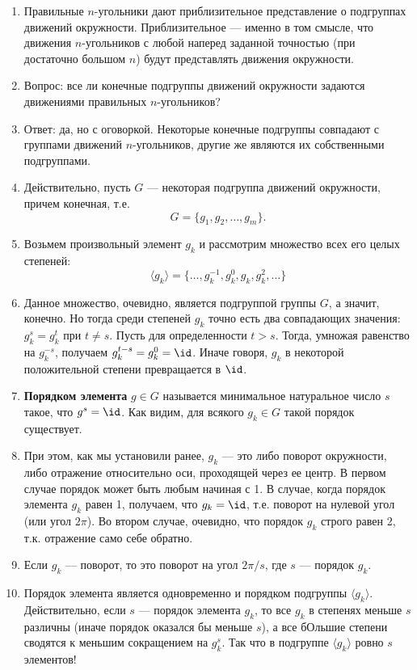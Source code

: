 \begin{enumerate}
\item Правильные $n$-угольники дают приблизительное представление о подгруппах движений окружности. Приблизительное --- именно в том смысле, что движения $n$-угольников с любой наперед заданной точностью (при достаточно большом $n$) будут представлять движения окружности.
\item Вопрос: все ли конечные подгруппы движений окружности задаются движениями правильных $n$-угольников?
\item Ответ: да, но с оговоркой. Некоторые конечные подгруппы совпадают с группами движений $n$-угольников, другие же являются их собственными подгруппами.
\item Действительно, пусть $G$ --- некоторая подгруппа движений окружности, причем конечная, т.е.
$$
G=\{g_1,g_2,\dots,g_m\}.
$$
\item Возьмем произвольный элемент $g_k$ и рассмотрим множество всех его целых степеней:
$$
\langle g_k\rangle=\{\dots,g_k^{-1},g_k^0,g_k,g_k^2,\dots\}
$$
\item Данное множество, очевидно, является подгруппой группы $G$, а значит, конечно. Но тогда среди степеней $g_k$ точно есть два совпадающих значения: $g_k^s=g_k^t$ при $t\ne s$. Пусть для определенности $t>s$. Тогда, умножая равенство на $g_k^{-s}$, получаем $g_k^{t-s}=g_k^0=\id$. Иначе говоря, $g_k$ в некоторой положительной степени превращается в $\id$.
\item \textbf{Порядком элемента} $g\in G$ называется минимальное натуральное число $s$ такое, что $g^s=\id$. Как видим, для всякого $g_k\in G$ такой порядок существует.
\item При этом, как мы установили ранее, $g_k$ --- это либо поворот окружности, либо отражение относительно оси, проходящей через ее центр. В первом случае порядок может быть любым начиная с 1. В случае, когда порядок элемента $g_k$ равен 1, получаем, что $g_k=\id$, т.е. поворот на нулевой угол (или угол $2\pi$). Во втором случае, очевидно, что порядок $g_k$ строго равен 2, т.к. отражение само себе обратно.
\item Если $g_k$ --- поворот, то это поворот на угол $2\pi/s$, где $s$ --- порядок $g_k$.
\item Порядок элемента является одновременно и порядком подгруппы $\langle g_k\rangle$. Действительно, если $s$ --- порядок элемента $g_k$, то все $g_k$ в степенях меньше $s$ различны (иначе порядок оказался бы меньше $s$), а все бОльшие степени сводятся к меньшим сокращением на $g_k^s$. Так что в подгруппе $\langle g_k\rangle$ ровно $s$ элементов!

\end{enumerate}
